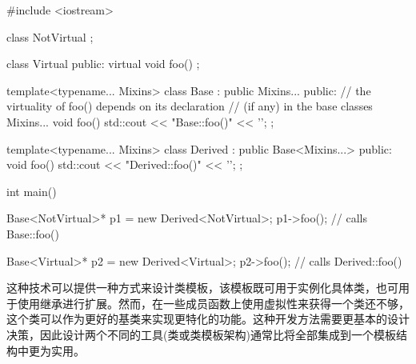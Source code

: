 \begin{cpp}
#include <iostream>

class NotVirtual {
};

class Virtual {
	public:
	virtual void foo() {
	}
};

template<typename... Mixins>
class Base : public Mixins... {
	public:
	// the virtuality of foo() depends on its declaration
	// (if any) in the base classes Mixins...
	void foo() {
		std::cout << "Base::foo()" << ’\n’;
	}
};

template<typename... Mixins>
class Derived : public Base<Mixins...> {
	public:
	void foo() {
		std::cout << "Derived::foo()" << ’\n’;
	}
};

int main()
{
	Base<NotVirtual>* p1 = new Derived<NotVirtual>;
	p1->foo(); // calls Base::foo()
	
	Base<Virtual>* p2 = new Derived<Virtual>;
	p2->foo(); // calls Derived::foo()
}
\end{cpp}

这种技术可以提供一种方式来设计类模板，该模板既可用于实例化具体类，也可用于使用继承进行扩展。然而，在一些成员函数上使用虚拟性来获得一个类还不够，这个类可以作为更好的基类来实现更特化的功能。这种开发方法需要更基本的设计决策，因此设计两个不同的工具(类或类模板架构)通常比将全部集成到一个模板结构中更为实用。






